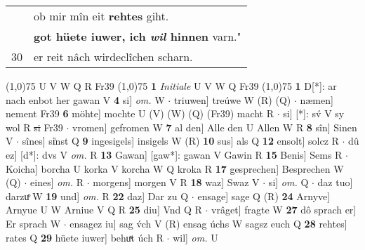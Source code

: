 \documentclass[8pt,a4paper,notitlepage]{article}
\begin{document}
\begin{table}[ht]
\begin{minipage}[t]{0.5\linewidth}
\begin{tabular}{rl}
 & ob mir mîn eit \textbf{rehtes} giht.\\ 
 & \textbf{got hüete iuwer, ich \textit{wil} hinnen} varn."\\ 
30 & er reit nâch wirdeclîchen scharn.\\ 
\end{tabular}
\scriptsize
\line(1,0){75} \newline
U V W Q R Fr39 \newline
\line(1,0){75} \newline
\textbf{1} \textit{Initiale} U V W Q Fr39  \newline
\line(1,0){75} \newline
\textbf{1} D[*]: ar nach enbot her gawan V \textbf{4} si] \textit{om.} W  $\cdot$ triuwen] treúwe W (R) (Q)  $\cdot$ næmen] nement Fr39 \textbf{6} möhte] mochte U (V) (W) (Q) (Fr39) macht R  $\cdot$ si] [*]: sv́ V sy wol R \sout{si} Fr39  $\cdot$ vromen] gefromen W \textbf{7} al den] Alle den U Allen W R \textbf{8} sîn] Sinen V  $\cdot$ sînes] si͑nst Q \textbf{9} ingesigels] insigels W (R) \textbf{10} sus] als Q \textbf{12} ensolt] solcz R  $\cdot$ dû ez] [d*]: dvs V \textit{om.} R \textbf{13} Gawan] [gaw*]: gawan V Gawin R \textbf{15} Benis] Sems R  $\cdot$ Koicha] borcha U korka V korcha W Q kroka R \textbf{17} gesprechen] Besprechen W (Q)  $\cdot$ eines] \textit{om.} R  $\cdot$ morgens] morgen V R \textbf{18} waz] Swaz V  $\cdot$ si] \textit{om.} Q  $\cdot$ daz tuo] darzuͦ W \textbf{19} und] \textit{om.} R \textbf{22} daz] Dar zu Q  $\cdot$ ensage] sage Q (R) \textbf{24} Arnyve] Arnyue U W Arniue V Q R \textbf{25} diu] Vnd Q R  $\cdot$ vrâget] fragte W \textbf{27} dô sprach er] Er sprach W  $\cdot$ ensagez iu] sag v́ch V (R) ensag úchs W sagsz euch Q \textbf{28} rehtes] rates Q \textbf{29} hüete iuwer] behuͯt úch R  $\cdot$ wil] \textit{om.} U \newline
\end{minipage}
\end{table}
\end{document}
